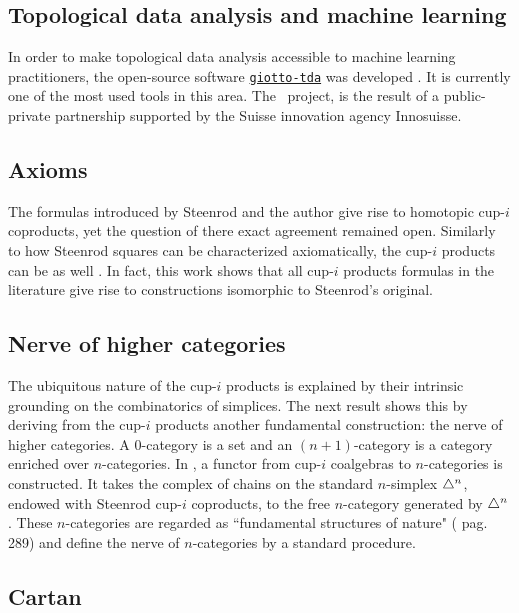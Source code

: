 \subsection{Topological data analysis and machine learning} \label{ss:giotto}

In order to make topological data analysis accessible to machine learning practitioners, the open-source software \href{https://giotto-ai.github.io/gtda-docs/latest/library.html}{\texttt{giotto-tda}} was developed \cite{medina2021giotto}.
It is currently one of the most used tools in this area.
The \giottoTDA\ project, is the result of a public-private partnership supported by the Suisse innovation agency Innosuisse.

\subsection{Axioms}

The formulas introduced by Steenrod and the author give rise to homotopic cup-$i$ coproducts, yet the question of there exact agreement remained open.
Similarly to how Steenrod squares can be characterized axiomatically, the cup-$i$ products can be as well \cite{medina2022axiomatic}.
In fact, this work shows that all cup-$i$ products formulas in the literature give rise to constructions isomorphic to Steenrod's original.

\subsection{Nerve of higher categories} \label{ss:nerve}

The ubiquitous nature of the cup-$i$ products is explained by their intrinsic grounding on the combinatorics of simplices.
The next result shows this by deriving from the cup-$i$ products another fundamental construction: the nerve of higher categories.
A $0$-category is a set and an $(n+1)$-category is a category enriched over $n$-categories.
In \cite{medina2020globular}, a functor from cup-$i$ coalgebras to $n$-categories is constructed.
It takes the complex of chains on the standard $n$-simplex $\triangle^n$, endowed with Steenrod cup-$i$ coproducts, to the free $n$-category generated by $\triangle^n$.
These $n$-categories are regarded as ``fundamental structures of nature" (\cite{street1987orientals} pag. 289) and define the nerve of $n$-categories by a standard procedure.

\subsection{Cartan} \label{ss:cartan}

